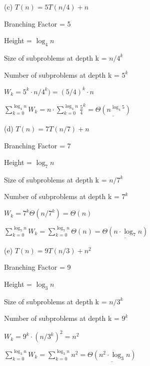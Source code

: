 \documentclass{article} %
\begin{document}
    \vspace{5pt}

    (c) $T(n) = 5T(n / 4) + n$

    \hspace{13pt} Branching Factor = 5
    
    \hspace{13pt} Height = $\log_4n $

    \hspace{13pt} Size of subproblems at depth k = $n / 4^k$
    
    \hspace{13pt} Number of subproblems at depth k = $5^k$

    \hspace{13pt} $W_k = 5^k \cdot n/4^k) = (5/4)^k \cdot n$

    \hspace{13pt} $\sum^{\log_4 n}_{k = 0} W_k = n \cdot \sum^{\log_4 n}_{k = 0} \frac{5}{4}^k = \underline{\Theta(n^{\log_4 5})}$

    \vspace{5pt} 

    (d) $T(n) = 7T(n / 7) + n$

    \hspace{13pt} Branching Factor = 7
    
    \hspace{13pt} Height = $\log_7n $

    \hspace{13pt} Size of subproblems at depth k = $n / 7^k$
    
    \hspace{13pt} Number of subproblems at depth k = $7^k$

    \hspace{13pt} $W_k = 7^k \Theta(n/7^k) = \Theta(n)$

    \hspace{13pt} $\sum^{\log_7 n}_{k = 0} W_k = \sum^{\log_7 n}_{k = 0} \Theta(n) = \underline{\Theta(n \cdot \log_7n)}$

    \vspace{5pt}

    (e) $T(n) = 9T(n / 3) + n^2$

    \hspace{13pt} Branching Factor = 9
    
    \hspace{13pt} Height = $\log_3n $

    \hspace{13pt} Size of subproblems at depth k = $n / 3^k$
    
    \hspace{13pt} Number of subproblems at depth k = $9^k$

    \hspace{13pt} $W_k = 9^k \cdot (n/3^k)^2 = n^2$

    \hspace{13pt} $\sum^{\log_3 n}_{k = 0} W_k = \sum^{\log_3 n}_{k = 0} n^2 = \underline{\Theta(n^2 \cdot \log_3n)}$
\end{document}
